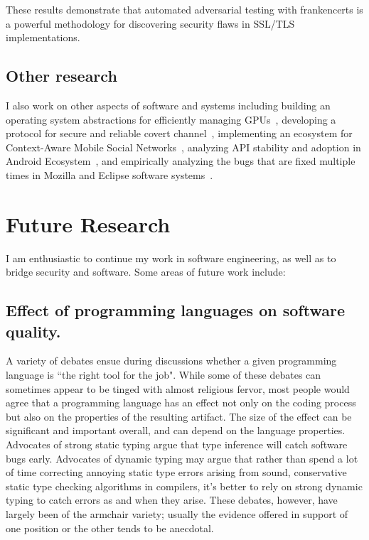 \documentclass[a4paper, 11pt]{article}
\begin{document}
\begin{small}
These results demonstrate that automated adversarial testing with
frankencerts is a powerful methodology for discovering security flaws
in SSL/TLS implementations.

\subsection*{\small Other research} I also work on other aspects of software and systems including 
building an operating system abstractions for efficiently managing GPUs~\cite{rossbach2011ptask}, 
developing a protocol for secure and reliable covert channel~\cite{ray2008protocol}, 
implementing an ecosystem for Context-Aware Mobile Social Networks~\cite{beach2008whozthat, beach2009touch}, 
analyzing API stability and adoption in Android Ecosystem~\cite{mcdonnell2013empirical}, and empirically analyzing 
the bugs that are fixed multiple times in Mozilla and Eclipse software systems~\cite{park2012empirical}.


\vspace{0.5cm}


\section*{Future Research}

I am enthusiastic to continue my work in software engineering, as well as to bridge security and software. 
Some areas of future work include:

\subsection*{\small Effect of programming languages on software quality.}
A variety of debates ensue during discussions whether a given programming language is ``the
right tool for the job". While some of these debates can sometimes appear to be tinged with
almost religious fervor, most people would agree that a programming language has an effect not
only on the coding process but also on the properties of the resulting artifact. The size of
the effect can be significant and important overall, and can depend on the language
properties. Advocates of strong static typing argue that type inference will catch software bugs early.
Advocates of dynamic typing may argue that rather than spend a lot of time correcting annoying
static type errors arising from sound, conservative static type checking algorithms in
compilers, it's better to rely on strong dynamic typing to catch errors as and when they arise.
These debates, however, have largely been of the armchair variety; usually the evidence offered
in support of one position or the other tends to be anecdotal. 


\end{small}
\end{document}

